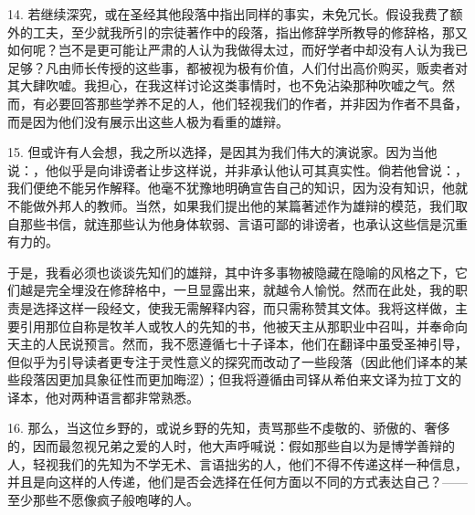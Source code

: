 14. 若继续深究，或在圣经其他段落中指出同样的事实，未免冗长。假设我费了额外的工夫，至少就我所引的宗徒著作中的段落，指出修辞学所教导的修辞格，那又如何呢？岂不是更可能让严肃的人认为我做得太过，而好学者中却没有人认为我已足够？凡由师长传授的这些事，都被视为极有价值，人们付出高价购买，贩卖者对其大肆吹嘘。我担心，在我这样讨论这类事情时，也不免沾染那种吹嘘之气。然而，有必要回答那些学养不足的人，他们轻视我们的作者，并非因为作者不具备，而是因为他们没有展示出这些人极为看重的雄辩。\par

15. 但或许有人会想，我之所以选择，是因其为我们伟大的演说家。因为当他说：，他似乎是向诽谤者让步这样说，并非承认他认可其真实性。倘若他曾说：，我们便绝不能另作解释。他毫不犹豫地明确宣告自己的知识，因为没有知识，他就不能做外邦人的教师。当然，如果我们提出他的某篇著述作为雄辩的模范，我们取自那些书信，就连那些认为他身体软弱、言语可鄙的诽谤者，也承认这些信是沉重有力的。\par

于是，我看必须也谈谈先知们的雄辩，其中许多事物被隐藏在隐喻的风格之下，它们越是完全埋没在修辞格中，一旦显露出来，就越令人愉悦。然而在此处，我的职责是选择这样一段经文，使我无需解释内容，而只需称赞其文体。我将这样做，主要引用那位自称是牧羊人或牧人的先知的书，他被天主从那职业中召叫，并奉命向天主的人民说预言。然而，我不愿遵循七十子译本，他们在翻译中虽受圣神引导，但似乎为引导读者更专注于灵性意义的探究而改动了一些段落（因此他们译本的某些段落因更加具象征性而更加晦涩）；但我将遵循由司铎从希伯来文译为拉丁文的译本，他对两种语言都非常熟悉。\par

16. 那么，当这位乡野的，或说乡野的先知，责骂那些不虔敬的、骄傲的、奢侈的，因而最忽视兄弟之爱的人时，他大声呼喊说：假如那些自以为是博学善辩的人，轻视我们的先知为不学无术、言语拙劣的人，他们不得不传递这样一种信息，并且是向这样的人传递，他们是否会选择在任何方面以不同的方式表达自己？——至少那些不愿像疯子般咆哮的人。\par

